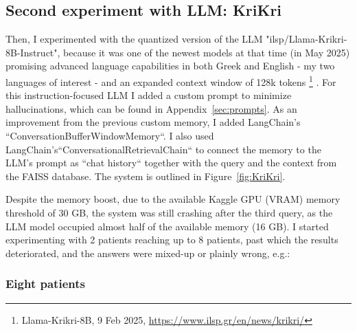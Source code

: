 \subsection{Second experiment with LLM: KriKri} \label{krikri}
Then, I experimented with the quantized version of the LLM "ilsp/Llama-Krikri-8B-Instruct", because it was one of the newest models at that time (in May 2025) promising advanced language capabilities in both Greek and English - my two languages of interest - and an expanded context window of 128k tokens \footnote{Llama-Krikri-8B, 9 Feb 2025, \url{https://www.ilsp.gr/en/news/krikri/}} . For this instruction-focused LLM I added a custom prompt to minimize hallucinations, which can be found in Appendix~\ref{sec:prompts}. Αs an improvement from the previous custom memory, I added LangChain’s ``ConversationBufferWindowMemory``. I also used LangChain’s``ConversationalRetrievalChain`` to connect the memory to the LLM’s prompt as ``chat history`` together with the query and the context from the FAISS database. The system is outlined in Figure~\ref{fig:KriKri}. 

Despite the memory boost, due to the available Kaggle GPU (VRAM) memory threshold of 30 GB, the system was still crashing after the third query, as the LLM model occupied almost half of the available memory (16 GB). I started experimenting with 2 patients reaching up to 8 patients, past which the results deteriorated, and the answers were mixed-up or plainly wrong, e.g.:

\subsubsection{Eight patients}

